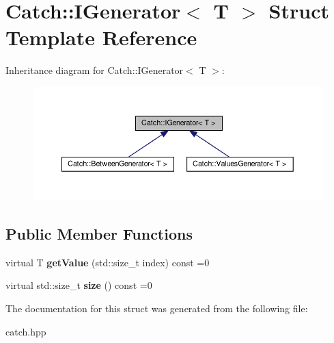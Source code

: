 \hypertarget{structCatch_1_1IGenerator}{}\section{Catch\+:\+:I\+Generator$<$ T $>$ Struct Template Reference}
\label{structCatch_1_1IGenerator}


Inheritance diagram for Catch\+:\+:I\+Generator$<$ T $>$\+:\nopagebreak
\begin{figure}[H]
\begin{center}
\leavevmode
\includegraphics[width=350pt]{structCatch_1_1IGenerator__inherit__graph}
\end{center}
\end{figure}
\subsection*{Public Member Functions}
\begin{DoxyCompactItemize}
\item 
\mbox{\label{structCatch_1_1IGenerator_ad69e937cb66dba3ed9429c42abf4fce3}} 
virtual T {\bfseries get\+Value} (std\+::size\+\_\+t index) const =0
\item 
\mbox{\label{structCatch_1_1IGenerator_a2e317253b03e838b6065ce69719a198e}} 
virtual std\+::size\+\_\+t {\bfseries size} () const =0
\end{DoxyCompactItemize}


The documentation for this struct was generated from the following file\+:\begin{DoxyCompactItemize}
\item 
catch.\+hpp\end{DoxyCompactItemize}
